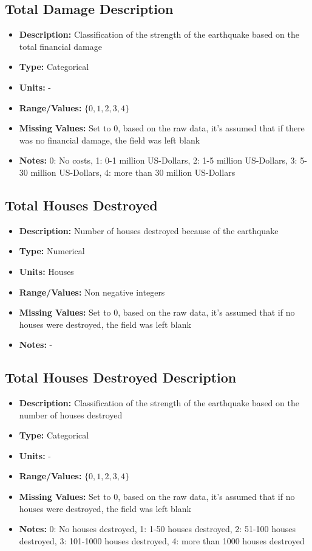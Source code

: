 \documentclass[a4paper]{article}
\begin{document}
\subsection{Total Damage Description}
\begin{itemize}
    \item \textbf{Description:} Classification of the strength of the earthquake based on the total financial damage
    \item \textbf{Type:} Categorical
    \item \textbf{Units:} -
    \item \textbf{Range/Values:} $\{0,1,2,3,4 \}$
    \item \textbf{Missing Values:} Set to 0, based on the raw data, it's assumed that if there was no financial damage, the field was left blank
    \item \textbf{Notes:} 0: No costs, 1: 0-1 million US-Dollars, 2: 1-5 million US-Dollars, 3: 5-30 million US-Dollars, 4: more than 30 million US-Dollars
\end{itemize}

\subsection{Total Houses Destroyed}
\begin{itemize}
    \item \textbf{Description:} Number of houses destroyed because of the earthquake
    \item \textbf{Type:} Numerical
    \item \textbf{Units:} Houses
    \item \textbf{Range/Values:} Non negative integers
    \item \textbf{Missing Values:} Set to 0, based on the raw data, it's assumed that if no houses were destroyed, the field was left blank
    \item \textbf{Notes:} -
\end{itemize}

\subsection{Total Houses Destroyed Description}
\begin{itemize}
    \item \textbf{Description:} Classification of the strength of the earthquake based on the number of houses destroyed
    \item \textbf{Type:} Categorical
    \item \textbf{Units:} -
    \item \textbf{Range/Values:} $\{0,1,2,3,4 \}$
    \item \textbf{Missing Values:} Set to 0, based on the raw data, it's assumed that if no houses were destroyed, the field was left blank
    \item \textbf{Notes:} 0: No houses destroyed, 1: 1-50 houses destroyed, 2: 51-100 houses destroyed, 3: 101-1000 houses destroyed, 4: more than 1000 houses destroyed
\end{itemize}
\end{document}
